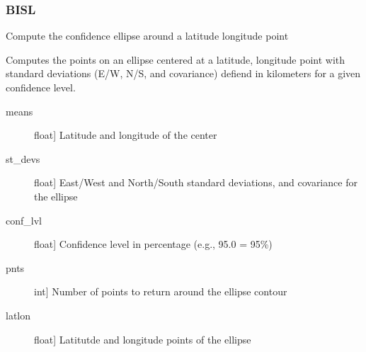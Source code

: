 \documentclass[letterpaper,10pt,english]{sphinxmanual}
\begin{document}
\subsubsection{BISL}
\label{\detokenize{infrapy.location:module-infrapy.location.bisl}}\label{\detokenize{infrapy.location:bisl}}

\begin{fulllineitems}
\label{\detokenize{infrapy.location:infrapy.location.bisl.calc_conf_ellipse}}
Compute the confidence ellipse around a latitude longitude point

Computes the points on an ellipse centered at a latitude, longitude point with
standard deviations (E/W, N/S, and covariance) defiend in kilometers for a given confidence
level.
\begin{description}
\item[{means}] \leavevmode{[}float{]}
Latitude and longitude of the center

\item[{st\_devs}] \leavevmode{[}float{]}
East/West and North/South standard deviations, and covariance for the ellipse

\item[{conf\_lvl}] \leavevmode{[}float{]}
Confidence level in percentage (e.g., 95.0 = 95\%)

\item[{pnts}] \leavevmode{[}int{]}
Number of points to return around the ellipse contour

\end{description}
\begin{description}
\item[{latlon}] \leavevmode{[}float{]}
Latitutde and longitude points of the ellipse

\end{description}

\end{fulllineitems}

\end{document}

